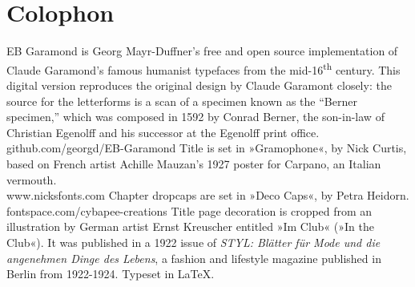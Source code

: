 \documentclass[
a5paper,
BCOR=7mm,
twoside,
DIV=calc,
11pt,
usegeometry,
chapterprefix,
headings=big]{scrbook} %
\begin{document}
\pagestyle{plain}

\renewcommand*\raggedchapter{\centering}





\tableofcontents
\enlargethispage{1.5\baselineskip}
\clearpage








\mainmatter
\pagestyle{headings}
\renewcommand*{\chapterpagestyle}{plain}


























\clearpage
{}
\chapter*{Colophon}
\begin{center}
EB Garamond is Georg Mayr-Duffner's free and open source implementation of Claude Garamond’s famous humanist typefaces from the mid-16\textsuperscript{th} century. This digital version reproduces the original design by Claude Garamont closely: the source for the letterforms is a scan of a specimen known as the \enquote{Berner specimen,} which was composed in 1592 by Conrad Berner, the son-in-law of Christian Egenolff and his successor at the Egenolff print office.  \\github.com/georgd/EB-Garamond
\vfill
Title is set in »Gramophone«, by Nick Curtis, based on French artist Achille Mauzan’s 1927 poster for Carpano, an Italian vermouth.\\www.nicksfonts.com
\vfill
Chapter dropcaps are set in »Deco Caps«, by Petra Heidorn.\\fontspace.com/cybapee-creations
\vfill
Title page decoration is cropped from an illustration by German artist Ernst Kreuscher entitled »Im Club« (»In the Club«). It was published in a 1922 issue of \textit{STYL: Blätter für Mode und die angenehmen Dinge des Lebens}, a fashion and lifestyle magazine published in Berlin from 1922-1924.
\vfill
Typeset in \LaTeX{}.
\end{center}
\thispagestyle{empty}
\end{document}
